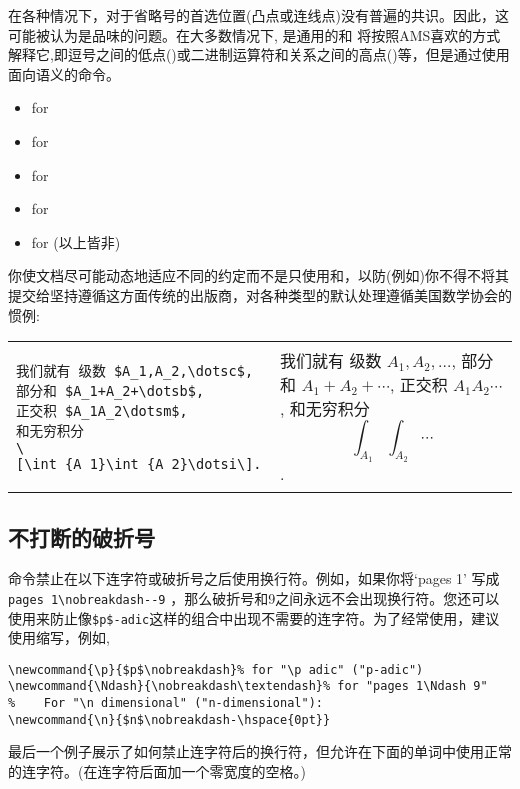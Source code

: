 在各种情况下，对于省略号的首选位置(凸点或连线点)没有普遍的共识。因此，这可能被认为是品味的问题。在大多数情况下,  是通用的和  将按照AMS喜欢的方式解释它,即逗号之间的低点()或二进制运算符和关系之间的高点()等，但是通过使用面向语义的命令。
\begin{itemize}
\setlength{\itemsep}{0pt}
\item {} for 
\item {} for 
\item {} for 
\item {} for 
\item {} for  (以上皆非)
\end{itemize}
你使文档尽可能动态地适应不同的约定而不是只使用和，以防(例如)你不得不将其提交给坚持遵循这方面传统的出版商，对各种类型的默认处理遵循美国数学协会的惯例:
\begin{center}
\vspace{-\topsep}
\begin{tabular}{@{}ll@{}}
\begin{minipage}[t]{.50\textwidth}
\small
\begin{verbatim}
我们就有 级数 $A_1,A_2,\dotsc$,
部分和 $A_1+A_2+\dotsb$,
正交积 $A_1A_2\dotsm$,
和无穷积分
\[\int_{A_1}\int_{A_2}\dotsi\].
\end{verbatim}
\end{minipage}
&
\begin{minipage}[t]{.48\textwidth}
\noindent
我们就有 级数 $A_1,A_2,\dotsc$,
部分和 $A_1+A_2+\dotsb$,
正交积 $A_1A_2\dotsm$,
和无穷积分
\[\int_{A_1}\int_{A_2}\dotsi\].
\end{minipage}
\end{tabular}
\end{center}

\subsection{不打断的破折号}

命令禁止在以下连字符或破折号之后使用换行符。例如，如果你将`pages 1' 写成 \verb|pages 1\nobreakdash--9| ，那么破折号和9之间永远不会出现换行符。您还可以使用来防止像\verb|$p$-adic|这样的组合中出现不需要的连字符。为了经常使用，建议使用缩写，例如,
\begin{verbatim}
\newcommand{\p}{$p$\nobreakdash}% for "\p adic" ("p-adic")
\newcommand{\Ndash}{\nobreakdash\textendash}% for "pages 1\Ndash 9"
%    For "\n dimensional" ("n-dimensional"):
\newcommand{\n}{$n$\nobreakdash-\hspace{0pt}}
\end{verbatim}
最后一个例子展示了如何禁止连字符后的换行符，但允许在下面的单词中使用正常的连字符。(在连字符后面加一个零宽度的空格。)

